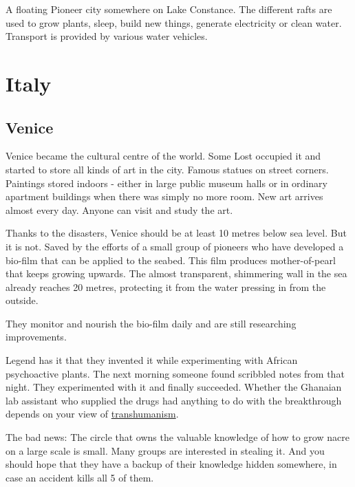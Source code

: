 A floating Pioneer city somewhere on Lake Constance. The different rafts are used to grow plants, sleep, build new things, generate electricity or clean water. Transport is provided by various water vehicles.

\section{Italy}

\subsection{Venice}

Venice became the cultural centre of the world. Some Lost occupied it and started to store all kinds of art in the city. Famous statues on street corners. Paintings stored indoors - either in large public museum halls or in ordinary apartment buildings when there was simply no more room. New art arrives almost every day.
Anyone can visit and study the art.

Thanks to the disasters, Venice should be at least 10 metres below sea level. But it is not. Saved by the efforts of a small group of pioneers who have developed a bio-film that can be applied to the seabed. This film produces mother-of-pearl that keeps growing upwards. The almost transparent, shimmering wall in the sea already reaches 20 metres, protecting it from the water pressing in from the outside.

They monitor and nourish the bio-film daily and are still researching improvements.

Legend has it that they invented it while experimenting with African psychoactive plants. The next morning someone found scribbled notes from that night. They experimented with it and finally succeeded. Whether the Ghanaian lab assistant who supplied the drugs had anything to do with the breakthrough depends on your view of \hyperref[sec:transhumanism]{transhumanism}.

The bad news: The circle that owns the valuable knowledge of how to grow nacre on a large scale is small. Many groups are interested in stealing it. And you should hope that they have a backup of their knowledge hidden somewhere, in case an accident kills all 5 of them.





